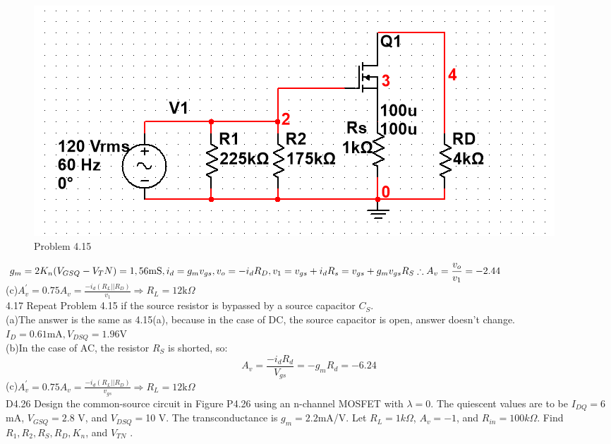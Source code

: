 \documentclass[a4paper,11pt,UTF8]{article}
\begin{document}
\begin{figure}[H] 
	\centering 
	\includegraphics[scale=0.5]{MD4.15_1.png}
	\caption{Problem 4.15}
\end{figure}
\noindent$\displaystyle g_m=2K_n(V_{GSQ}-V_TN)=1,56\mathrm{mS}, i_d=g_mv_{gs},v_o=-i_dR_D,v_1=v_{gs}+i_dR_s=v_{gs}+g_mv_{gs}R_S\\ \therefore A_v=\frac{v_o}{v_1}=-2.44$\\
(c)$\displaystyle A_v^\prime=0.75A_v=\frac{-i_d(R_L||R_D)}{v_{1}}\Rightarrow R_L=12\mathrm{k}\Omega$\\
4.17 Repeat Problem 4.15 if the source resistor is bypassed by a source capacitor
$C_S$.\\
(a)The answer is the same as 4.15(a), because in the case of DC, the source capacitor is open, answer doesn't change.\\
$I_D=0.61\mathrm{mA},V_{DSQ}=1.96\mathrm{V}$\\
(b)In the case of AC, the resistor $R_S$ is shorted, so:
$$
	A_v=\frac{-i_dR_d}{V_{gs}}=-g_mR_d=-6.24
$$
(c)$\displaystyle A_v^\prime=0.75A_v=\frac{-i_d(R_L||R_D)}{v_{gs}}\Rightarrow R_L=12\mathrm{k}\Omega$\\
D4.26 Design the common-source circuit in Figure P4.26 using an n-channel
MOSFET with $\lambda = 0$. The quiescent values are to be $I_{DQ} = 6 $mA,
$V_{GSQ} = 2.8$ V, and $V_{DSQ} = $10 V. The transconductance is $g_m = 2.2 $mA/V.
Let $R_L = 1 k\Omega$, $A_v = -1$, and $R_{in} = 100 k\Omega$. Find $R_1, R_2, R_S, R_D, K_n$, and $V_{T N}$ .\\
\end{document}
